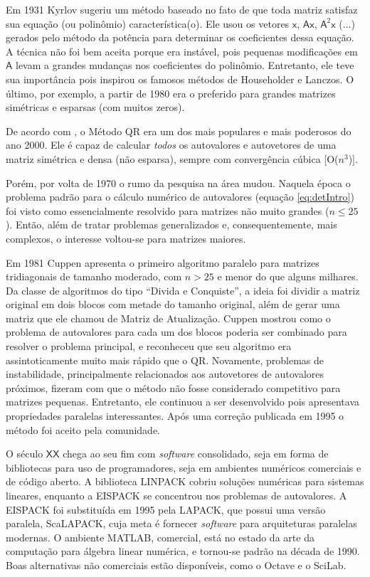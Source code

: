 	Em 1931 Kyrlov sugeriu um método baseado no fato de que toda matriz satisfaz sua equação (ou polinômio) característica(o). Ele usou os vetores $\mathsf{x}$, $\mathsf{A}\mathsf{x}$, $\mathsf{A}^2\mathsf{x}$ (...) gerados pelo método da potência para determinar os coeficientes dessa equação. A técnica não foi bem aceita porque era instável, pois pequenas modificações em $\mathsf{A}$ levam a grandes mudanças nos coeficientes do polinômio. Entretanto, ele teve sua importância pois inspirou os famosos métodos de Householder e Lanczos. O último, por exemplo, a partir de 1980 era o preferido para grandes matrizes simétricas e esparsas (com muitos zeros).
	
	 De acordo com \cite{autovaloresSecXX}, o Método QR era um dos mais populares e mais poderosos do ano 2000. Ele é capaz de calcular \emph{todos} os autovalores e autovetores de uma matriz simétrica e densa (não esparsa), sempre  com convergência cúbica [O($n^3$)].
	
	Porém, por volta de 1970 o rumo da pesquisa na área mudou. Naquela época o problema padrão para o cálculo numérico de autovalores (equação \ref{eq:detIntro}) foi visto como essencialmente resolvido para matrizes não muito grandes ($n \leq 25$). Então, além de tratar problemas generalizados e, consequentemente, mais complexos, o interesse voltou-se para matrizes maiores.
	
	Em 1981 Cuppen apresenta o primeiro algoritmo paralelo para matrizes tridiagonais de tamanho moderado, com $n > 25$ e menor do que alguns milhares. Da classe de algoritmos do tipo ``Divida e Conquiste'', a ideia foi dividir a matriz original em dois blocos com metade do tamanho original, além de gerar uma matriz que ele chamou de Matriz de Atualização. Cuppen mostrou como o problema de autovalores para cada um dos blocos poderia ser combinado para resolver o problema principal, e reconheceu que seu algoritmo era assintoticamente muito mais rápido que o QR. Novamente, problemas de instabilidade, principalmente relacionados aos autovetores de autovalores próximos, fizeram com que o método não fosse considerado competitivo para matrizes pequenas. Entretanto, ele continuou a ser desenvolvido pois apresentava propriedades paralelas interessantes. Após uma correção publicada em 1995 o método foi aceito pela comunidade.
	
	O século $\mathsf{XX}$ chega ao seu fim com \emph{software} consolidado, seja em forma de bibliotecas para uso de programadores, seja em ambientes numéricos comerciais e de código aberto. A biblioteca LINPACK cobriu soluções numéricas para sistemas lineares, enquanto a EISPACK se concentrou nos problemas de autovalores. A EISPACK foi substituída em 1995 pela LAPACK, que possui uma versão paralela, ScaLAPACK, cuja meta é fornecer \emph{software} para arquiteturas paralelas modernas. O ambiente MATLAB, comercial, está no estado da arte da computação para álgebra linear numérica, e tornou-se padrão na década de 1990. Boas alternativas não comerciais estão disponíveis, como o Octave e o SciLab.
		
